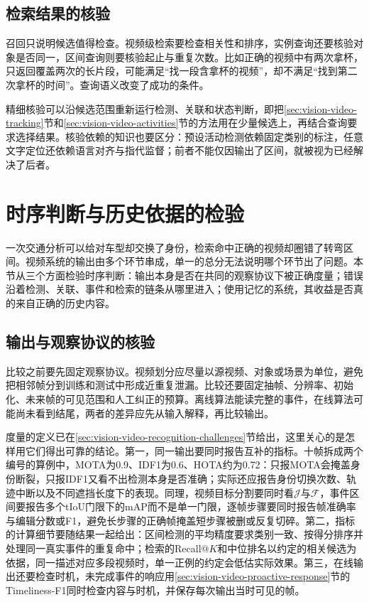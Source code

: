 \subsection{检索结果的核验}
\label{sec:vision-video-retrieval-check}

召回只说明候选值得检查。视频级检索要检查相关性和排序，实例查询还要核验对象是否同一，区间查询则要核验起止与重复次数。比如正确的视频中有两次拿杯，只返回覆盖两次的长片段，可能满足“找一段含拿杯的视频”，却不满足“找到第二次拿杯的时间”。查询语义改变了成功的条件。

精细核验可以沿候选范围重新运行检测、关联和状态判断，即把\ref{sec:vision-video-tracking}节和\ref{sec:vision-video-activities}节的方法用在少量候选上，再结合查询要求选择结果。核验依赖的知识也要区分：预设活动检测依赖固定类别的标注，任意文字定位还依赖语言对齐与指代监督；前者不能仅因输出了区间，就被视为已经解决了后者。

\section{时序判断与历史依据的检验}
\label{sec:vision-video-evaluation}

一次交通分析可以给对车型却交换了身份，检索命中正确的视频却圈错了转弯区间。视频系统的输出由多个环节串成，单一的总分无法说明哪个环节出了问题。本节从三个方面检验时序判断：输出本身是否在共同的观察协议下被正确度量；错误沿着检测、关联、事件和检索的链条从哪里进入；使用记忆的系统，其收益是否真的来自正确的历史内容。

\subsection{输出与观察协议的核验}
\label{sec:vision-video-output-protocol}

比较之前要先固定观察协议。视频划分应尽量以源视频、对象或场景为单位，避免把相邻帧分到训练和测试中形成近重复泄漏。比较还要固定抽帧、分辨率、初始化、未来帧的可见范围和人工纠正的预算。离线算法能读完整的事件，在线算法可能尚未看到结尾，两者的差异应先从输入解释，再比较输出。

度量的定义已在\ref{sec:vision-video-recognition-challenges}节给出，这里关心的是怎样用它们得出可靠的结论。第一，同一输出要同时报告互补的指标。十帧拆成两个编号的算例中，MOTA为0.9、IDF1为0.6、HOTA约为0.72：只报MOTA会掩盖身份断裂，只报IDF1又看不出检测本身是否准确；实际还应报告身份切换次数、轨迹中断以及不同遮挡长度下的表现。同理，视频目标分割要同时看$\mathcal{J}$与$\mathcal{F}$，事件区间要报告多个tIoU门限下的mAP而不是单一门限，逐帧步骤要同时报告帧准确率与编辑分数或F1，避免长步骤的正确帧掩盖短步骤被删或反复切碎。第二，指标的计算细节要随结果一起给出：区间检测的平均精度要求类别一致、按得分排序并处理同一真实事件的重复命中；检索的Recall@$K$和中位排名以约定的相关候选为依据，同一描述对应多段视频时，单一正例的约定会低估实际效果。第三，在线输出还要检查时机，未完成事件的响应用\ref{sec:vision-video-proactive-response}节的Timeliness-F1同时检查内容与时机，并保存每次输出当时可见的帧。


